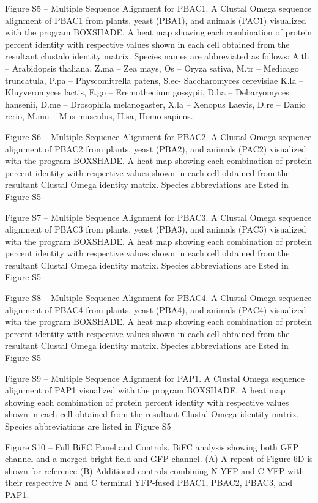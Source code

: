 Figure S5 – Multiple Sequence Alignment for PBAC1. A Clustal Omega \citep{sievers14} sequence alignment of PBAC1 from plants, yeast (PBA1), and animals (PAC1) visualized with the program BOXSHADE. A heat map showing each combination of protein percent identity with respective values shown in each cell obtained from the resultant clustalo identity matrix. Species names are abbreviated as follows: A.th – Arabidopsis thaliana, Z.ma – Zea mays, Os – Oryza sativa, M.tr – Medicago truncatula, P.pa – Physcomitrella patens, S.ec- Saccharomyces cerevisiae K.la – Kluyveromyces lactis, E.go – Eremothecium gossypii, D.ha – Debaryomyces hansenii, D.me – Drosophila melanogaster, X.la – Xenopus Laevis, D.re – Danio rerio, M.mu – Mus musculus, H.sa, Homo sapiens.


Figure S6 – Multiple Sequence Alignment for PBAC2. A Clustal Omega \citep{sievers14} sequence alignment of PBAC2 from plants, yeast (PBA2), and animals (PAC2) visualized with the program BOXSHADE. A heat map showing each combination of protein percent identity with respective values shown in each cell obtained from the resultant Clustal Omega identity matrix. Species abbreviations are listed in Figure S5

Figure S7 – Multiple Sequence Alignment for PBAC3. A Clustal Omega \citep{sievers14} sequence alignment of PBAC3 from plants, yeast (PBA3), and animals (PAC3) visualized with the program BOXSHADE. A heat map showing each combination of protein percent identity with respective values shown in each cell obtained from the resultant Clustal Omega identity matrix. Species abbreviations are listed in Figure S5

Figure S8 – Multiple Sequence Alignment for PBAC4. A Clustal Omega \citep{sievers14} sequence alignment of PBAC4 from plants, yeast (PBA4), and animals (PAC4) visualized with the program BOXSHADE. A heat map showing each combination of protein percent identity with respective values shown in each cell obtained from the resultant Clustal Omega identity matrix. Species abbreviations are listed in Figure S5

Figure S9 – Multiple Sequence Alignment for PAP1. A Clustal Omega \citep{sievers14} sequence alignment of PAP1 visualized with the program BOXSHADE. A heat map showing each combination of protein percent identity with respective values shown in each cell obtained from the resultant Clustal Omega identity matrix. Species abbreviations are listed in Figure S5

Figure S10 – Full BiFC Panel and Controls. BiFC analysis showing both GFP channel and a merged bright-field and GFP channel. (A) A repeat of Figure 6D is shown for reference (B) Additional controls combining N-YFP and C-YFP with their respective N and C terminal YFP-fused PBAC1, PBAC2, PBAC3, and PAP1.

